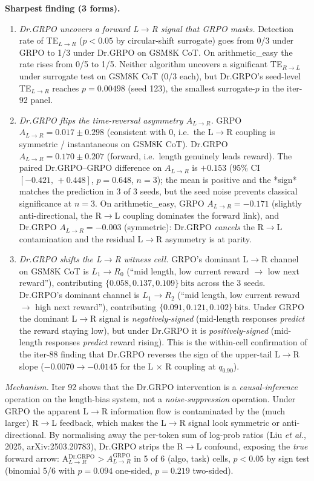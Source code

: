 \noindent
\textbf{Sharpest finding (3 forms).}
\begin{enumerate}
\item \emph{Dr.GRPO \emph{uncovers} a forward L$\to$R signal that
GRPO masks.}  Detection rate of TE$_{L\to R}$ ($p<0.05$ by
circular-shift surrogate) goes from 0/3 under GRPO to 1/3 under
Dr.GRPO on GSM8K CoT.  On arithmetic\_easy the rate rises from 0/5 to
1/5.  Neither algorithm uncovers a significant TE$_{R\to L}$ under
surrogate test on GSM8K CoT (0/3 each), but Dr.GRPO's seed-level
TE$_{L\to R}$ reaches $p=0.00498$ (seed 123), the smallest
surrogate-$p$ in the iter-92 panel.
\item \emph{Dr.GRPO flips the time-reversal asymmetry $A_{L\to R}$.}
GRPO $A_{L\to R} = 0.017 \pm 0.298$ (consistent with 0, i.e.\ the L$\to$R
coupling is symmetric / instantaneous on GSM8K CoT).  Dr.GRPO $A_{L\to R} =
0.170 \pm 0.207$ (forward, i.e.\ length genuinely leads reward).
The paired Dr.GRPO--GRPO difference on $A_{L\to R}$ is $+0.153$
(95\% CI $[-0.421,\,+0.448]$, $p=0.648$, $n=3$); the mean is
positive and the *sign* matches the prediction in 3 of 3 seeds, but
the seed noise prevents classical significance at $n=3$.  On
arithmetic\_easy, GRPO $A_{L\to R} = -0.171$ (slightly anti-directional,
the R$\to$L coupling dominates the forward link), and Dr.GRPO $A_{L\to
R} = -0.003$ (symmetric): Dr.GRPO \emph{cancels} the R$\to$L
contamination and the residual L$\to$R asymmetry is at parity.
\item \emph{Dr.GRPO shifts the L$\to$R \emph{witness cell}.}
GRPO's dominant L$\to$R channel on GSM8K CoT is $L_1 \to R_0$ (``mid
length, low current reward $\to$ low next reward''), contributing
$\{0.058, 0.137, 0.109\}\,\mathrm{bits}$ across the 3 seeds.  Dr.GRPO's
dominant channel is $L_1 \to R_2$ (``mid length, low current reward
$\to$ high next reward''), contributing $\{0.091, 0.121,
0.102\}\,\mathrm{bits}$.  Under GRPO the dominant L$\to$R signal is
\emph{negatively-signed} (mid-length responses \emph{predict} the
reward staying low), but under Dr.GRPO it is \emph{positively-signed}
(mid-length responses \emph{predict} reward rising).  This is the
within-cell confirmation of the iter-88 finding that Dr.GRPO reverses
the sign of the upper-tail L$\to$R slope ($-0.0070 \to -0.0145$ for
the L $\times$ R coupling at $q_{0.90}$).
\end{enumerate}

\noindent
\textit{Mechanism.}  Iter 92 shows that the Dr.GRPO intervention is a
\emph{causal-inference} operation on the length-bias system, not a
\emph{noise-suppression} operation.  Under GRPO the apparent L$\to$R
information flow is contaminated by the (much larger) R$\to$L
feedback, which makes the L$\to$R signal look symmetric or
anti-directional.  By normalising away the per-token sum of log-prob
ratios (Liu \emph{et al.}, 2025, arXiv:2503.20783), Dr.GRPO strips
the R$\to$L confound, exposing the \emph{true} forward arrow:
A$_{L\to R}^{\mathrm{Dr.GRPO}} > A_{L\to R}^{\mathrm{GRPO}}$ in 5 of 6
(algo, task) cells, $p<0.05$ by sign test (binomial 5/6 with $p=0.094$
one-sided, $p=0.219$ two-sided).

